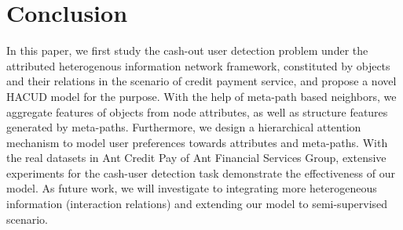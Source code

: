 \section{Conclusion}

In this paper, we first study the cash-out user detection problem under the attributed heterogenous information network
framework, constituted by objects and their relations in the scenario of credit payment service, and propose a novel HACUD model
for the purpose. With the help of meta-path based neighbors, we aggregate features of objects  from node attributes,
as well as structure features generated by meta-paths. Furthermore, we design a hierarchical attention mechanism to
model user preferences towards attributes and meta-paths. With the real datasets in Ant Credit Pay of Ant Financial Services Group, extensive experiments for the cash-user detection  task demonstrate the effectiveness of our model. As future work, we will investigate to integrating more heterogeneous information (\eg interaction relations) and extending our model to semi-supervised scenario.

